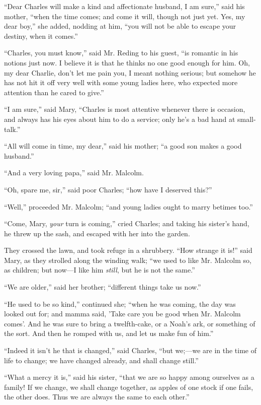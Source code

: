 ``Dear Charles will make a kind and affectionate husband, I am
sure,'' said his mother, ``when the time comes; and come it
will, though not just yet. Yes, my dear boy,'' she added, nodding
at him, ``you will not be able to escape your destiny, when it
comes.''

``Charles, you must know,'' said Mr. Reding to his guest,
``is romantic in his notions just now. I believe it is that he
thinks no one good enough for him. Oh, my dear Charlie, don't let me
pain you, I meant nothing serious; but somehow he has not hit it off
very well with some young ladies here, who expected more attention
than he cared to give.''

``I am sure,'' said Mary, ``Charles is most attentive
whenever there is occasion, and always has his eyes about him to do a
service; only he's a bad hand at small-talk.''

``All will come in time, my dear,'' said his mother;
``a good son makes a good husband.''

``And a very loving papa,'' said Mr. Malcolm.

``Oh, spare me, sir,'' said poor Charles; ``how have I
deserved this?''

``Well,'' proceeded Mr. Malcolm; ``and young ladies
ought to marry betimes too.''

``Come, Mary, \emph{your} turn is coming,'' cried Charles;
and taking his sister's hand, he threw up the sash, and escaped with
her into the garden.

They crossed the lawn, and took refuge in a shrubbery. ``How
strange it is!'' said Mary, as they strolled along the winding
walk; ``we used to like Mr. Malcolm so, as children; but now—I
like him \emph{still}, but he is not the same.''

``We are older,'' said her brother; ``different things
take us now.''

``He used to be so kind,'' continued she; ``when he was
coming, the day was looked out for; and mamma said, 'Take care you be
good when Mr. Malcolm comes'. And he was sure to bring a twelfth-cake,
or a Noah's ark, or something of the sort. And then he romped with us,
and let us make fun of him.''

``Indeed it isn't he that is changed,'' said Charles,
``but we;—we are in the time of life to change; we have changed
already, and shall change still.''

``What a mercy it is,'' said his sister, ``that we are
so happy among ourselves as a family! If we change, we shall change
together, as apples of one stock if one fails, the other does. Thus we
are always the same to each other.''

